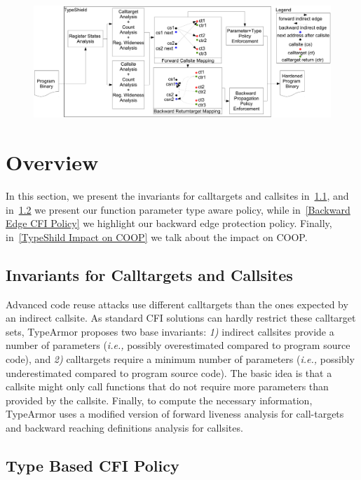 \begin{centering}
 \begin{figure}[ht]
   \includegraphics[width=.88\textwidth]{figures/overview.pdf}
 \end{figure}
\end{centering}
\section{Overview}
\label{chapter:TypeShild Overview}
In this section, we present the invariants for calltargets and callsites in~\cref{Invariants for Targets and Callsites}, and 
in~\cref{TypeShield Policy Mechanism} we present our function parameter type aware policy, while
in~\cref{Backward Edge CFI Policy} we highlight our backward edge protection policy. 
Finally, in~\cref{TypeShild Impact on COOP} we talk about the impact on COOP.

\subsection{Invariants for Calltargets and Callsites}
\label{Invariants for Targets and Callsites}
Advanced code reuse attacks use different calltargets than the ones expected by an indirect 
callsite. As standard CFI solutions can hardly restrict these calltarget sets, TypeArmor proposes two base invariants:
\textit{1)} indirect callsites provide a number of parameters (\textit{i.e.,} possibly overestimated compared to program source code), and 
\textit{2)} calltargets require a minimum number of parameters (\textit{i.e.,} possibly underestimated compared to program source code).
The basic idea is that a callsite might only call functions that do not require more parameters than provided by the callsite. 
Finally, to compute the necessary information, TypeArmor uses a modified version of forward liveness analysis for call-targets and 
backward reaching definitions analysis for callsites.

\subsection{Type Based CFI Policy}
\label{TypeShield Policy Mechanism}

